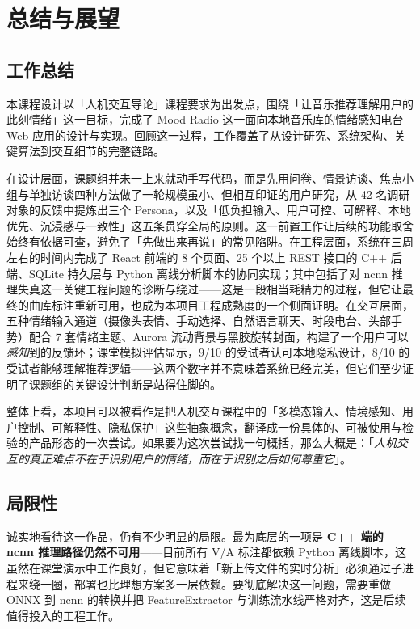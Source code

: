 \chapter{总结与展望}\label{chap:conclusion}

\section{工作总结}

本课程设计以「人机交互导论」课程要求为出发点，围绕「让音乐推荐理解用户的此刻情绪」这一目标，完成了 Mood Radio 这一面向本地音乐库的情绪感知电台 Web 应用的设计与实现。回顾这一过程，工作覆盖了从设计研究、系统架构、关键算法到交互细节的完整链路。

在设计层面，课题组并未一上来就动手写代码，而是先用问卷、情景访谈、焦点小组与单独访谈四种方法做了一轮规模虽小、但相互印证的用户研究，从 42 名调研对象的反馈中提炼出三个 Persona，以及「低负担输入、用户可控、可解释、本地优先、沉浸感与一致性」这五条贯穿全局的原则。这一前置工作让后续的功能取舍始终有依据可查，避免了「先做出来再说」的常见陷阱。在工程层面，系统在三周左右的时间内完成了 React 前端的 8 个页面、25 个以上 REST 接口的 C++ 后端、SQLite 持久层与 Python 离线分析脚本的协同实现；其中包括了对 ncnn 推理失真这一关键工程问题的诊断与绕过——这是一段相当耗精力的过程，但它让最终的曲库标注重新可用，也成为本项目工程成熟度的一个侧面证明。在交互层面，五种情绪输入通道（摄像头表情、手动选择、自然语言聊天、时段电台、头部手势）配合 7 套情绪主题、Aurora 流动背景与黑胶旋转封面，构建了一个用户可以\emph{感知}到的反馈环；课堂模拟评估显示，9/10 的受试者认可本地隐私设计，8/10 的受试者能够理解推荐逻辑——这两个数字并不意味着系统已经完美，但它们至少证明了课题组的关键设计判断是站得住脚的。

整体上看，本项目可以被看作是把人机交互课程中的「多模态输入、情境感知、用户控制、可解释性、隐私保护」这些抽象概念，翻译成一份具体的、可被使用与检验的产品形态的一次尝试。如果要为这次尝试找一句概括，那么大概是：「\emph{人机交互的真正难点不在于识别用户的情绪，而在于识别之后如何尊重它}」。

\section{局限性}

诚实地看待这一作品，仍有不少明显的局限。最为底层的一项是 \textbf{C++ 端的 ncnn 推理路径仍然不可用}——目前所有 V/A 标注都依赖 Python 离线脚本，这虽然在课堂演示中工作良好，但它意味着「新上传文件的实时分析」必须通过子进程来绕一圈，部署也比理想方案多一层依赖。要彻底解决这一问题，需要重做 ONNX 到 ncnn 的转换并把 FeatureExtractor 与训练流水线严格对齐，这是后续值得投入的工程工作。

